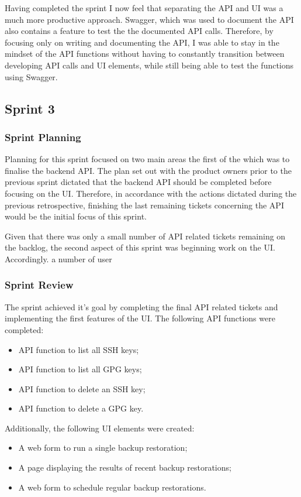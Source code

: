   Having completed the sprint I now feel that separating the API and UI was a much more productive approach. Swagger, which was used to document the API also contains a feature to test the the documented API calls. Therefore, by focusing only on writing and documenting the API, I was able to stay in the mindset of the API functions without having to constantly transition between developing API calls and UI elements, while still being able to test the functions using Swagger.
  
   \subsection{Sprint 3}
   \subsubsection{Sprint Planning}
   Planning for this sprint focused on two main areas the first of the which was to finalise the backend API. The plan set out with the product owners prior to the previous sprint dictated that the backend API should be completed before focusing on the UI. Therefore, in accordance with the actions dictated during the previous retrospective, finishing the last remaining tickets concerning the API would be the initial focus of this sprint.
   
   Given that there was only a small number of API related tickets remaining on the backlog, the second aspect of this sprint was beginning work on the UI. Accordingly. a number of user 
   
   \subsubsection{Sprint Review}
   The sprint achieved it's goal by completing the final API related tickets and implementing the first features of the UI. The following API functions were completed:
   \begin{itemize} 
     \item API function to list all SSH keys;
     \item API function to list all GPG keys;
     \item API function to delete an SSH key;
     \item API function to delete a GPG key.
   \end{itemize}
   Additionally, the following UI elements were created:
  \begin{itemize} 
    \item A web form to run a single backup restoration;
    \item A page displaying the results of recent backup restorations;
    \item A web form to schedule regular backup restorations.
  \end{itemize}
  
